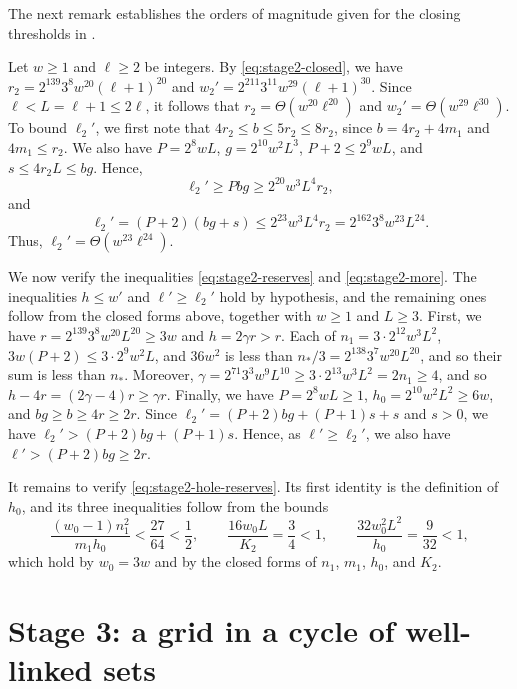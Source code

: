 \documentclass[fontsize=12pt,leading=14pt]{fullpaper}
\begin{document}
The next remark establishes the orders of magnitude given for the closing thresholds in .

\begin{remark}\label{rem:closing-size}
  Let $w\ge1$ and $\ell\ge2$ be integers.
  By \eqref{eq:stage2-closed}, we have $r_2=2^{139}3^8w^{20}(\ell+1)^{20}$ and $w_2'=2^{211}3^{11}w^{29}(\ell+1)^{30}$.
  Since $\ell<L=\ell+1\le2\ell$, it follows that $r_2=\Theta(w^{20}\ell^{20})$ and $w_2'=\Theta(w^{29}\ell^{30})$.
  To bound $\ell_2'$, we first note that $4r_2\le b\le5r_2\le8r_2$, since $b=4r_2+4m_1$ and $4m_1\le r_2$.
  We also have $P=2^8wL$, $g=2^{10}w^2L^3$, $P+2\le2^9wL$, and $s\le4r_2L\le bg$.
  Hence,
  \[
    \ell_2'\ge Pbg\ge2^{20}w^3L^4r_2,
  \]
  and
  \begin{equation}\label{eq:stage2-ell2bound}
    \ell_2'=(P+2)(bg+s)
    \le2^{23}w^3L^4r_2
    =2^{162}3^8w^{23}L^{24}.
  \end{equation}
  Thus, $\ell_2'=\Theta(w^{23}\ell^{24})$.
\end{remark}

We now verify the inequalities \eqref{eq:stage2-reserves} and \eqref{eq:stage2-more}.
The inequalities $h\le w'$ and $\ell'\ge\ell_2'$ hold by hypothesis, and the remaining ones follow from the closed forms above, together with $w\ge1$ and $L\ge3$.
First, we have $r=2^{139}3^8w^{20}L^{20}\ge3w$ and $h=2\gamma r>r$.
Each of $n_1=3\cdot2^{12}w^3L^2$, $3w(P+2)\le3\cdot2^9w^2L$, and $36w^2$ is less than $n_*/3=2^{138}3^7w^{20}L^{20}$, and so their sum is less than $n_*$.
Moreover, $\gamma=2^{71}3^3w^9L^{10}\ge3\cdot2^{13}w^3L^2=2n_1\ge4$, and so $h-4r=(2\gamma-4)r\ge\gamma r$.
Finally, we have $P=2^8wL\ge1$, $h_0=2^{10}w^2L^2\ge6w$, and $bg\ge b\ge4r\ge2r$.
Since $\ell_2'=(P+2)bg+(P+1)s+s$ and $s>0$, we have $\ell_2'>(P+2)bg+(P+1)s$.
Hence, as $\ell'\ge\ell_2'$, we also have $\ell'>(P+2)bg\ge2r$.

It remains to verify \eqref{eq:stage2-hole-reserves}.
Its first identity is the definition of $h_0$, and its three inequalities follow from the bounds
\[
  \frac{(w_0-1)n_1^2}{m_1h_0}<\frac{27}{64}<\frac12,\qquad
  \frac{16w_0L}{K_2}=\frac34<1,\qquad
  \frac{32w_0^2L^2}{h_0}=\frac9{32}<1,
\]
which hold by $w_0=3w$ and by the closed forms of $n_1$, $m_1$, $h_0$, and $K_2$.


%
\section{Stage 3: a grid in a cycle of well-linked sets}\label{sec:stage3}
\end{document}
